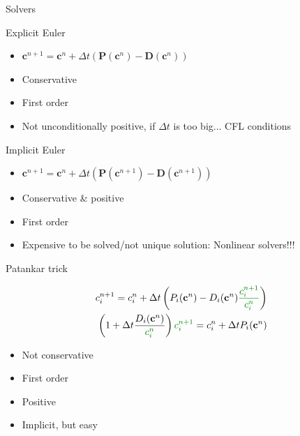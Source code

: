 \documentclass[aspectratio=169]{beamer}
\newcommand{\1}{\begin{pmatrix}
                 1\\
                 1
                \end{pmatrix}}
\def\bc{\mathbf{c}}
\def\bP{\mathbf{P}}
\def\bD{\mathbf{D}}
\begin{document}
\begin{frame}{Solvers}
	\begin{minipage}{0.45\textwidth}
\begin{block}{Explicit Euler}
\begin{itemize}
\item $\bc^{n+1}= \bc^n +\Delta t \left( \bP(\bc^n) -\bD(\bc^n) \right)$
\item Conservative 
\item First order
\item Not unconditionally positive, if $\Delta t$ is too big... CFL conditions
\end{itemize}
\end{block}
	\end{minipage} \hfill
\begin{minipage}{0.49\textwidth}
\begin{block}{Implicit Euler}
\begin{itemize}
	\item $
	\bc^{n+1}= \bc^n +\Delta t \left( \bP(\bc^{n+1}) -\bD(\bc^{n+1})\right)
	$
	\item Conservative \& positive
	\item First order
	\item Expensive to be solved/not unique solution: Nonlinear solvers!!!
\end{itemize}
\end{block}
\end{minipage}
\begin{block}{Patankar trick}
	\begin{minipage}{0.48\textwidth}
\vspace*{-2mm}\begin{equation*}
\begin{split}
c_i^{n+1}= c_i^n +\Delta t \left( P_i(\bc^{n}) -D_i(\bc^{n}){\color{lightgreen}\frac{c_i^{n+1}}{c_i^n}}\right) \\
\left( 1+\Delta t \frac{D_i(\bc^n)}{\color{lightgreen}c_i^n} \right){\color{lightgreen} c_i^{n+1}} = c^n_i +\Delta t P_i(\bc^{n}) 
\end{split}
\end{equation*}
	\end{minipage}\hfill
\begin{minipage}{0.45\textwidth}
\begin{itemize}
	\item Not conservative
	\item First order
	\item Positive
	\item Implicit, but easy
\end{itemize}
\end{minipage}
\end{block}

\end{frame}
\end{document}
